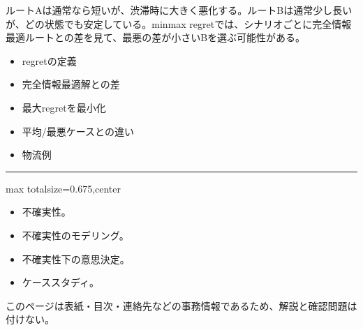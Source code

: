 ルートAは通常なら短いが、渋滞時に大きく悪化する。ルートBは通常少し長いが、どの状態でも安定している。minmax regretでは、シナリオごとに完全情報最適ルートとの差を見て、最悪の差が小さいBを選ぶ可能性がある。\par
{}
\begin{itemize}
\item regretの定義
\item 完全情報最適解との差
\item 最大regretを最小化
\item 平均/最悪ケースとの違い
\item 物流例
\end{itemize}
\vspace{2mm}\hrule\vspace{2mm}

\clearpage
{}
\begin{adjustbox}{max totalsize={\textwidth}{0.675\textheight},center}
\begin{minipage}{\textwidth}\scriptsize
\begin{minipage}[t]{0.485\textwidth}
\begin{itemize}
\item 不確実性。
\item 不確実性のモデリング。
\item 不確実性下の意思決定。
\item ケーススタディ。
\end{itemize}
\end{minipage}\hfill
\begin{minipage}[t]{0.485\textwidth}
{\small このページは表紙・目次・連絡先などの事務情報であるため、解説と確認問題は付けない。}
\end{minipage}
\end{minipage}
\end{adjustbox}

